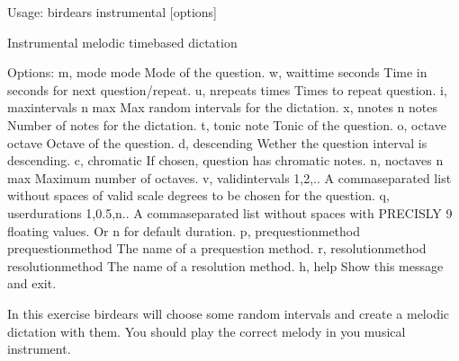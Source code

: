 \documentclass[letterpaper,10pt,english]{sphinxmanual}
\begin{document}
\begin{sphinxVerbatim}[commandchars=\\\{\}]
Usage: birdears instrumental [options]

  Instrumental melodic time\PYGZhy{}based dictation

Options:
  \PYGZhy{}m, \PYGZhy{}\PYGZhy{}mode \PYGZlt{}mode\PYGZgt{}               Mode of the question.
  \PYGZhy{}w, \PYGZhy{}\PYGZhy{}wait\PYGZus{}time \PYGZlt{}seconds\PYGZgt{}       Time in seconds for next question/repeat.
  \PYGZhy{}u, \PYGZhy{}\PYGZhy{}n\PYGZus{}repeats \PYGZlt{}times\PYGZgt{}         Times to repeat question.
  \PYGZhy{}i, \PYGZhy{}\PYGZhy{}max\PYGZus{}intervals \PYGZlt{}n max\PYGZgt{}     Max random intervals for the dictation.
  \PYGZhy{}x, \PYGZhy{}\PYGZhy{}n\PYGZus{}notes \PYGZlt{}n notes\PYGZgt{}         Number of notes for the dictation.
  \PYGZhy{}t, \PYGZhy{}\PYGZhy{}tonic \PYGZlt{}note\PYGZgt{}              Tonic of the question.
  \PYGZhy{}o, \PYGZhy{}\PYGZhy{}octave \PYGZlt{}octave\PYGZgt{}           Octave of the question.
  \PYGZhy{}d, \PYGZhy{}\PYGZhy{}descending                Wether the question interval is descending.
  \PYGZhy{}c, \PYGZhy{}\PYGZhy{}chromatic                 If chosen, question has chromatic notes.
  \PYGZhy{}n, \PYGZhy{}\PYGZhy{}n\PYGZus{}octaves \PYGZlt{}n max\PYGZgt{}         Maximum number of octaves.
  \PYGZhy{}v, \PYGZhy{}\PYGZhy{}valid\PYGZus{}intervals \PYGZlt{}1,2,..\PYGZgt{}  A comma\PYGZhy{}separated list without spaces
                                  of valid scale degrees to be chosen for the
                                  question.
  \PYGZhy{}q, \PYGZhy{}\PYGZhy{}user\PYGZus{}durations \PYGZlt{}1,0.5,n..\PYGZgt{}
                                  A comma\PYGZhy{}separated list without
                                  spaces with PRECISLY 9 floating values. Or
                                  \PYGZsq{}n\PYGZsq{} for default              duration.
  \PYGZhy{}p, \PYGZhy{}\PYGZhy{}prequestion\PYGZus{}method \PYGZlt{}prequestion\PYGZus{}method\PYGZgt{}
                                  The name of a pre\PYGZhy{}question method.
  \PYGZhy{}r, \PYGZhy{}\PYGZhy{}resolution\PYGZus{}method \PYGZlt{}resolution\PYGZus{}method\PYGZgt{}
                                  The name of a resolution method.
  \PYGZhy{}h, \PYGZhy{}\PYGZhy{}help                      Show this message and exit.

  In this exercise birdears will choose some random intervals and create a
  melodic dictation with them. You should play the correct melody in you
  musical instrument.


\end{sphinxVerbatim}
\end{document}
